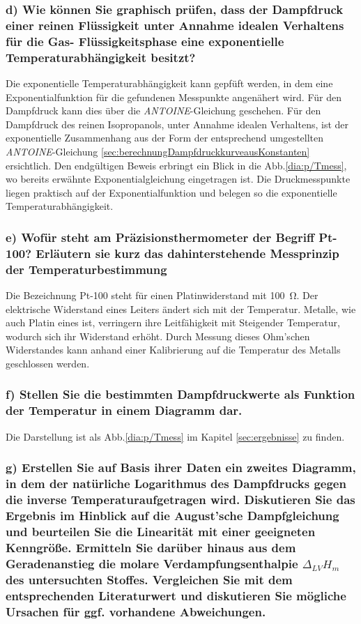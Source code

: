 \subsubsection*{d{)} Wie können Sie graphisch prüfen, dass der Dampfdruck einer reinen Flüssigkeit unter Annahme idealen Verhaltens für die Gas- Flüssigkeitsphase eine exponentielle Temperaturabhängigkeit besitzt?}

Die exponentielle Temperaturabhängigkeit kann gepfüft werden, in dem eine Exponentialfunktion für die gefundenen Messpunkte angenähert wird. Für den Dampfdruck kann dies über die \textit{ANTOINE}-Gleichung geschehen. Für den Dampfdruck des reinen Isopropanols, unter Annahme idealen Verhaltens, ist der exponentielle Zusammenhang aus der Form der entsprechend umgestellten \textit{ANTOINE}-Gleichung \ref{sec:berechnungDampfdruckkurveausKonstanten} ersichtlich. Den endgültigen Beweis erbringt ein Blick in die Abb.\ref{dia:p/Tmess}, wo bereits erwähnte Exponentialgleichung eingetragen ist. Die Druckmesspunkte liegen praktisch auf der Exponentialfunktion und belegen so die exponentielle Temperaturabhängigkeit. 


\subsubsection*{e{)} Wofür steht am Präzisionsthermometer der Begriff Pt-100? Erläutern sie kurz das dahinterstehende Messprinzip der Temperaturbestimmung}

Die Bezeichnung Pt-100 steht für einen Platinwiderstand mit \SI{100}{\ohm}. Der elektrische Widerstand eines Leiters ändert sich mit der Temperatur. Metalle, wie auch Platin eines ist, verringern ihre Leitfähigkeit mit Steigender Temperatur, wodurch sich ihr Widerstand erhöht. Durch Messung dieses Ohm'schen Widerstandes kann anhand einer Kalibrierung auf die Temperatur des Metalls geschlossen werden.\cite{Widerstandsthermometer}

\subsubsection*{f{)} Stellen Sie die bestimmten Dampfdruckwerte als Funktion der Temperatur in einem Diagramm dar.}

Die Darstellung ist als Abb.\ref{dia:p/Tmess} im Kapitel \ref{sec:ergebnisse} zu finden.

\subsubsection*{g{)} Erstellen Sie auf Basis ihrer Daten ein zweites Diagramm, in dem der natürliche Logarithmus des Dampfdrucks gegen die inverse Temperaturaufgetragen wird. Diskutieren Sie das Ergebnis im Hinblick auf die August'sche Dampfgleichung und beurteilen Sie die Linearität mit einer geeigneten Kenngröße. Ermitteln Sie darüber hinaus aus dem Geradenanstieg die molare Verdampfungsenthalpie $\Delta_{LV}H_m$ des untersuchten Stoffes. Vergleichen Sie mit dem entsprechenden Literaturwert und diskutieren Sie mögliche Ursachen für ggf. vorhandene Abweichungen.}

